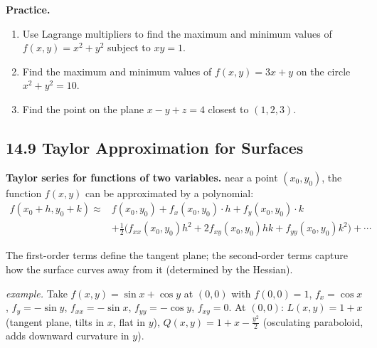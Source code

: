 \documentclass[12pt]{article}
\theoremstyle{compact}
\begin{document}
\medskip\textbf{Practice.}
\begin{enumerate}[noitemsep]
  \item Use Lagrange multipliers to find the maximum and minimum values of $f(x,y)=x^2+y^2$ subject to $xy=1$.
  \item Find the maximum and minimum values of $f(x,y)=3x+y$ on the circle $x^2+y^2=10$.
  \item Find the point on the plane $x-y+z=4$ closest to $(1,2,3)$.
\end{enumerate}

\subsection{14.9 Taylor Approximation for Surfaces}

\textbf{Taylor series for functions of two variables.} near a point $(x_0, y_0)$, the function $f(x,y)$ can be approximated by a polynomial:
\begin{align*}
f(x_0+h, y_0+k) \approx{}& f(x_0,y_0) + f_x(x_0,y_0) \cdot h + f_y(x_0,y_0) \cdot k\\
&+ \tfrac{1}{2}\big(f_{xx}(x_0,y_0) h^2 + 2f_{xy}(x_0,y_0) hk + f_{yy}(x_0,y_0) k^2\big) + \cdots
\end{align*}

The first-order terms define the tangent plane; the second-order terms capture how the surface curves away from it (determined by the Hessian).

\textit{example.} Take $f(x,y)=\sin x+\cos y$ at $(0,0)$ with $f(0,0)=1$, $f_x=\cos x$, $f_y=-\sin y$, $f_{xx}=-\sin x$, $f_{yy}=-\cos y$, $f_{xy}=0$.
At $(0,0)$: $L(x,y)=1+x$ (tangent plane, tilts in $x$, flat in $y$), $Q(x,y)=1+x-\tfrac{y^2}{2}$ (osculating paraboloid, adds downward curvature in $y$).
\end{document}
